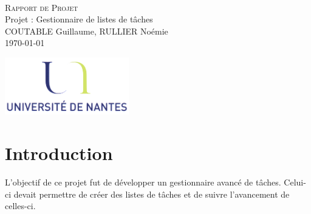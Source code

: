\documentclass[a4paper,10pt]{article}
\begin{document}
\fancyhead[LE,CE,RE,LO,CO,RO]{}
\fancyfoot[LE,CE,RE,LO,CO,RO]{}
\renewcommand{\headrulewidth}{0.4pt}
\renewcommand{\footrulewidth}{0.4pt}

\begin{titlepage}

\vspace*{\fill}~
\begin{center}
{\large \textsc{Rapport de Projet}} \\
\vspace{1cm}
{\LARGE Projet : Gestionnaire de listes de tâches} \\
\vspace{1cm}
COUTABLE Guillaume, RULLIER Noémie \\
\today
\end{center}
\vspace*{\fill}

\begin{center}
\noindent 
\includegraphics[height=2.5cm]{Images/universite.png}
\end{center}
\pagebreak
\end{titlepage}

\newpage
\tableofcontents  

\newpage
\pagestyle{fancy}

\section{Introduction}
L'objectif de ce projet fut de développer un gestionnaire avancé de tâches. Celui-ci devait permettre de créer des listes de tâches et de suivre l'avancement de celles-ci.
\end{document}
